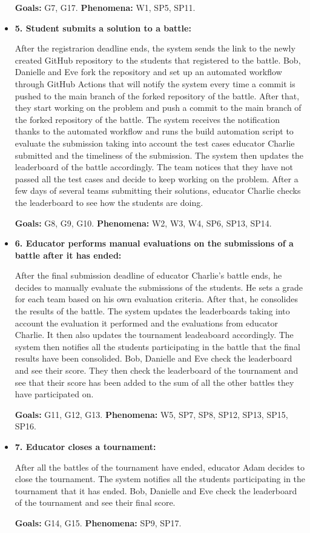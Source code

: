 \documentclass{article}
\begin{document}
\begin{itemize}
    \textbf{Goals:} G7, G17.
    \textbf{Phenomena:} W1, SP5, SP11.

    \item \textbf{5. Student submits a solution to a battle:}
    
    After the registrarion deadline ends, the system sends the link to the newly created GitHub repository to the students that registered to the battle. Bob, Danielle and Eve fork the repository and set up an automated workflow through GitHub Actions that will notify the system every time a commit is pushed to the main branch of the forked repository of the battle. After that, they start working on the problem and push a commit to the main branch of the forked repository of the battle. The system receives the notification thanks to the automated workflow and runs the build automation script to evaluate the submission taking into account the test cases educator Charlie submitted and the timeliness of the submission. The system then updates the leaderboard of the battle accordingly. The team notices that they have not passed all the test cases and decide to keep working on the problem. After a few days of several teams submitting their solutions, educator Charlie checks the leaderboard to see how the students are doing.

    \textbf{Goals:} G8, G9, G10.
    \textbf{Phenomena:} W2, W3, W4, SP6, SP13, SP14.

    \item \textbf{6. Educator performs manual evaluations on the submissions of a battle after it has ended:}
    
    After the final submission deadline of educator Charlie's battle ends, he decides to manually evaluate the submissions of the students. He sets a grade for each team based on his own evaluation criteria. After that, he consolides the results of the battle. The system updates the leaderboards taking into account the evaluation it performed and the evaluations from educator Charlie. It then also updates the tournament leadeaboard accordingly. The system then notifies all the students participating in the battle that the final results have been consolided. Bob, Danielle and Eve check the leaderboard and see their score. They then check the leaderboard of the tournament and see that their score has been added to the sum of all the other battles they have participated on.

    \textbf{Goals:} G11, G12, G13.
    \textbf{Phenomena:} W5, SP7, SP8, SP12, SP13, SP15, SP16.

    \item \textbf{7. Educator closes a tournament:}
    
    After all the battles of the tournament have ended, educator Adam decides to close the tournament. The system notifies all the students participating in the tournament that it has ended. Bob, Danielle and Eve check the leaderboard of the tournament and see their final score.

    \textbf{Goals:} G14, G15.
    \textbf{Phenomena:} SP9, SP17.


\end{itemize}
\end{document}
